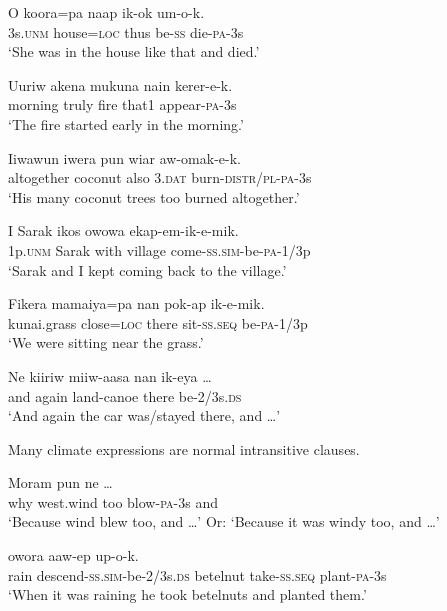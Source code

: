\ea%
\label{ex:x964}
\gll O  koora=pa  naap  ik-ok  um-o-k. \\
     3s.\textsc{unm}  house=\textsc{loc}  thus  be-\textsc{ss}  die-\textsc{pa}-3s \\
\glt `She was in the house like that and died.'
\z

\ea%
\label{ex:x959}
\gll Uuriw  akena  mukuna  nain  kerer-e-k. \\
     morning  truly  fire  that1  appear-\textsc{pa}-3s \\
\glt `The fire started early in the morning.'
\z

\ea%
\label{ex:x960}
\gll Iiwawun  iwera  pun  wiar  aw-omak-e-k. \\
     altogether  coconut  also  3.\textsc{dat}  burn-\textsc{distr}/\textsc{pl}-\textsc{pa}-3s \\
\glt `His many coconut trees too burned altogether.'
\z

\ea%
\label{ex:x965}
\gll I  Sarak  ikos  owowa  ekap-em-ik-e-mik. \\
     1p.\textsc{unm}  Sarak  with  village  come-\textsc{ss}.\textsc{sim}-be-\textsc{pa}-1/3p \\
\glt `Sarak and I kept coming back to the village.'
\z

\ea%
\label{ex:x962}
\gll Fikera  mamaiya=pa  nan  pok-ap  ik-e-mik. \\
     kunai.grass  close=\textsc{loc}  there  sit-\textsc{ss}.\textsc{seq}  be-\textsc{pa}-1/3p \\
\glt `We were sitting near the  grass.'
\z

\ea%
\label{ex:x968}
\gll Ne  kiiriw  miiw-aasa  nan  ik-eya  {\dots} \\
     and  again  land-canoe  there  be-2/3s.\textsc{ds} \\
\glt `And again the car was/stayed there, and {\dots}'
\z

Many climate expressions are normal intransitive clauses.

\ea%
\label{ex:x1020}
\gll Moram   pun    ne  {\dots} \\
     why  west.wind  too  blow-\textsc{pa}-3s  and \\
\glt `Because wind blew too, and {\dots}' Or: `Because it was windy too, and {\dots}'
\z

\ea%
\label{ex:x1022}
\gll {}   owora  aaw-ep  up-o-k. \\
     rain  descend-\textsc{ss}.\textsc{sim}-be-2/3s.\textsc{ds}  betelnut  take-\textsc{ss}.\textsc{seq}  plant-\textsc{pa}-3s \\
\glt `When it was raining he took betelnuts and planted them.'
\z

